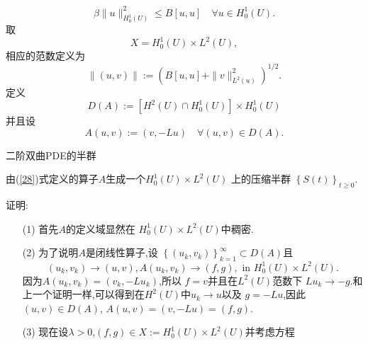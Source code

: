 \begin{frame}[t]
  \begin{equation}\label{26}
    \beta\|u\|^2_{H^{1}_0(U)}\le B[u,u]\quad \forall u \in H_0^{1}(U).
  \end{equation}
  取
   \[
     X=H_0^{1}(U)\times L^2(U),
  \] 
  相应的范数定义为
  \begin{equation}\label{27}
    \|(u,v)\|:=(B[u,u]+\|v\|^2_{L^2(u)})^{1 /2}.
  \end{equation}
  定义
  \[
    D(A):=[H^2(U)\cap H_0^{1}(U)]\times H_0^{1}(U)
  \] 
  并且设
  \begin{equation}\label{28}
    A(u,v):=(v,-Lu) \quad \forall (u,v)\in D(A).
  \end{equation}
\end{frame}
\begin{frame}[t]{二阶双曲PDE的半群}
  \begin{theorem}
    由{\normalfont (\ref{28})}式定义的算子$A$生成一个$H_0^{1}(U)\times L^2(U)$ 上的压缩半群 $\left\{S(t)\right\} _{t\ge 0}$.
\end{theorem}
证明:
\begin{enumerate}
  \item [(1)] 首先$A$的定义域显然在 $H_0^{1}(U)\times L^2(U)$中稠密.
  \item [(2)] 为了说明$A$是闭线性算子,设 $\left\{(u_k,v_k)\right\} _{k=1}^{\infty}\subset D(A)$且
    \[
      (u_k,v_k)\to (u,v), A(u_k,v_k)\to (f,g), \text{ in } H_0^{1}(U)\times L^2(U).
    \] 
    因为$A(u_k,v_k)=(v_k,-Lu_k)$,所以 $f=v$并且在$L^2(U)$范数下 $Lu_k\to -g$.和上一个证明一样,可以得到在$H^2(U)$中$u_k\to u$以及 $g=-Lu$,因此 $(u,v)\in D(A)$, $A(u,v)=(v,-Lu)=(f,g)$.
  \item [(3)] 现在设$\lambda>0$,$(f,g)\in X:=H_0^{1}(U)\times L^2(U)$并考虑方程
\end{enumerate}
\end{frame}

